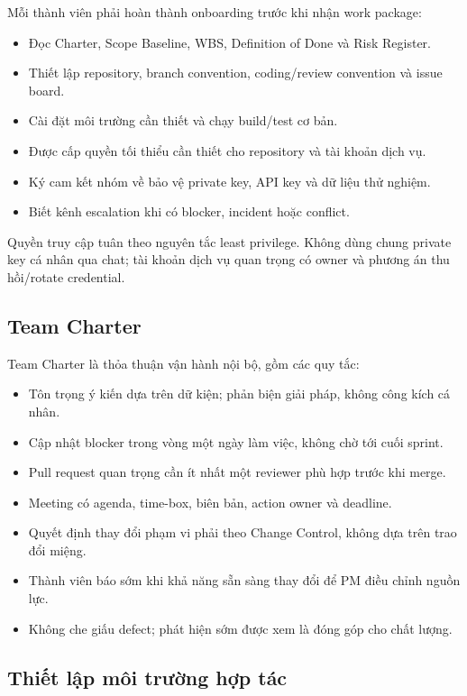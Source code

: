 Mỗi thành viên phải hoàn thành onboarding trước khi nhận work package:

\begin{itemize}
  \item Đọc Charter, Scope Baseline, WBS, Definition of Done và Risk Register.
  \item Thiết lập repository, branch convention, coding/review convention và issue board.
  \item Cài đặt môi trường cần thiết và chạy build/test cơ bản.
  \item Được cấp quyền tối thiểu cần thiết cho repository và tài khoản dịch vụ.
  \item Ký cam kết nhóm về bảo vệ private key, API key và dữ liệu thử nghiệm.
  \item Biết kênh escalation khi có blocker, incident hoặc conflict.
\end{itemize}

Quyền truy cập tuân theo nguyên tắc least privilege. Không dùng chung private key cá nhân qua chat; tài khoản dịch vụ quan trọng có owner và phương án thu hồi/rotate credential.

\subsection{Team Charter}

Team Charter là thỏa thuận vận hành nội bộ, gồm các quy tắc:

\begin{itemize}
  \item Tôn trọng ý kiến dựa trên dữ kiện; phản biện giải pháp, không công kích cá nhân.
  \item Cập nhật blocker trong vòng một ngày làm việc, không chờ tới cuối sprint.
  \item Pull request quan trọng cần ít nhất một reviewer phù hợp trước khi merge.
  \item Meeting có agenda, time-box, biên bản, action owner và deadline.
  \item Quyết định thay đổi phạm vi phải theo Change Control, không dựa trên trao đổi miệng.
  \item Thành viên báo sớm khi khả năng sẵn sàng thay đổi để PM điều chỉnh nguồn lực.
  \item Không che giấu defect; phát hiện sớm được xem là đóng góp cho chất lượng.
\end{itemize}

\subsection{Thiết lập môi trường hợp tác}

